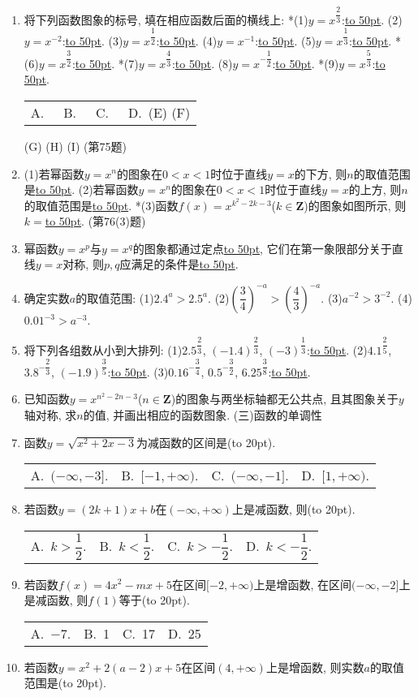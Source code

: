 \documentclass[10pt,a4paper]{article}
\newcommand{\blank}[1]{\underline{\hbox to #1pt{}}}
\newcommand{\bracket}[1]{(\hbox to #1pt{})}
\newcommand{\fourch}[4]{\par\begin{tabular}{p{.23\textwidth}p{.23\textwidth}p{.23\textwidth}p{.23\textwidth}}
A.~#1 &B.~#2& C.~#3& D.~#4
\end{tabular}}
\begin{document}
\begin{enumerate}[1.]
(2)$y=x^{\dfrac 35}x\in$\blank{50}, $u\in$\blank{50}.
(3)$y=x^{\dfrac 85}x\in$\blank{50}, $u\in$\blank{50}.
(4)$y=x^{-\dfrac 54}x\in$\blank{50}, $u\in$\blank{50}.
(5)$y=x^{-\dfrac 53}x\in$\blank{50}, $u\in$\blank{50}.
(6)$y=x^{-\dfrac 23}x\in$\blank{50}, $u\in$\blank{50}.
(7)$y=-2(x+5)^{-\dfrac 14}x\in$\blank{50}, $u\in$\blank{50}.
(8)$y=5(2x-1)^{\dfrac 34}x\in$\blank{50}, $u\in$\blank{50}.
\item 将下列函数图象的标号, 填在相应函数后面的横线上:
*(1)$y=x^{\dfrac 23}$:\blank{50}.	(2)$y=x^{-2}$:\blank{50}.
(3)$y=x^{\dfrac 12}$:\blank{50}.				(4)$y=x^{-1}$:\blank{50}.
(5)$y=x^{\dfrac 13}$:\blank{50}.				*(6)$y=x^{\dfrac 32}$:\blank{50}.
*(7)$y=x^{\dfrac 43}$:\blank{50}.			(8)$y=x^{-\dfrac 12}$:\blank{50}.
*(9)$y=x^{\dfrac 53}$:\blank{50}.
\fourch{}{}{}{(E) (F)}
(G) (H) (I)
(第75题)
\item (1)若幂函数$y=x^n$的图象在$0<x<1$时位于直线$y=x$的下方, 则$n$的取值范围是\blank{50}.
(2)若幂函数$y=x^n$的图象在$0<x<1$时位于直线$y=x$的上方, 则$n$的取值范围是\blank{50}.
*(3)函数$f(x)=x^{k^2-2k-3}$($k\in \mathbf{Z}$)的图象如图所示, 则$k=$\blank{50}.
(第76(3)题)
\item 幂函数$y=x^p$与$y=x^q$的图象都通过定点\blank{50}, 它们在第一象限部分关于直线$y=x$对称, 则$p,q$应满足的条件是\blank{50}.
\item 确定实数$a$的取值范围:
(1)$2.4^a>2.5^a.$				(2)$(\dfrac 34)^{-a}>(\dfrac 43)^{-a}.$
(3)$a^{-2}>3^{-2}.$				(4)$0.01^{-3}>a^{-3}.$
\item 将下列各组数从小到大排列:
(1)$2.5^{\dfrac 23}$, $(-1.4)^{\dfrac 23}$, $(-3)^{\dfrac 13}$:\blank{50}.
(2)$4.1^{\dfrac 25}$, $3.8^{-\dfrac 23}$, $(-1.9)^{\dfrac 35}$:\blank{50}.
(3)$0.16^{-\dfrac 34}$, $0.5^{-\dfrac 32}$, $6.25^{\dfrac 38}$:\blank{50}.
\item 已知函数$y=x^{n^2-2n-3}$($n\in \mathbf{Z}$)的图象与两坐标轴都无公共点, 且其图象关于$y$轴对称, 求$n$的值, 并画出相应的函数图象.
(三)函数的单调性
\item 函数$y=\sqrt {x^2+2x-3}$为减函数的区间是\bracket{20}.
\fourch{$(-\infty ,-3 ].$}{$[ -1,+\infty).$}{$(-\infty ,-1 ].$}{$[ 1,+\infty).$}
\item 若函数$y=(2k+1)x+b$在$(-\infty ,+\infty)$上是减函数, 则\bracket{20}.
\fourch{$k>\dfrac 12.$}{$k<\dfrac 12.$}{$k>-\dfrac 12.$}{$k<-\dfrac 12.$}
\item 若函数$f(x)=4x^2-mx+5$在区间$[ -2,+\infty)$上是增函数, 在区间$(-\infty ,-2 ]$上是减函数, 则$f(1)$等于\bracket{20}.
\fourch{$-7.$}{1}{17}{25}
\item 若函数$y=x^2+2(a-2)x+5$在区间$(4,+\infty)$上是增函数, 则实数$a$的取值范围是\bracket{20}.

\end{enumerate}
\end{document}
